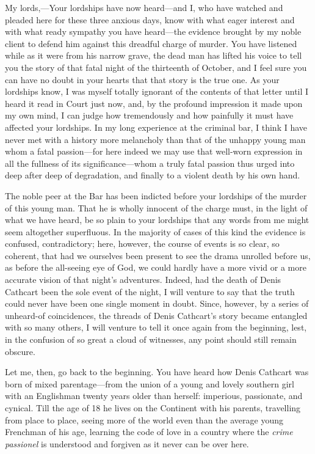 \begin{dialogue}
 My lords,—Your lordships have now heard—and I, who have watched and pleaded here for these three anxious days, know with what eager interest and with what ready sympathy you have heard—the evidence brought by my noble client to defend him against this dreadful charge of murder. You have listened while as it were from his narrow grave, the dead man has lifted his voice to tell you the story of that fatal night of the thirteenth of October, and I feel sure you can have no doubt in your hearts that that story is the true one. As your lordships know, I was myself totally ignorant of the contents of that letter until I heard it read in Court just now, and, by the profound impression it made upon my own mind, I can judge how tremendously and how painfully it must have affected your lordships. In my long experience at the criminal bar, I think I have never met with a history more melancholy than that of the unhappy young man whom a fatal passion—for here indeed we may use that well-worn expression in all the fullness of its significance—whom a truly fatal passion thus urged into deep after deep of degradation, and finally to a violent death by his own hand.

\smallskip 

The noble peer at the Bar has been indicted before your lordships of the murder of this young man. That he is wholly innocent of the charge must, in the light of what we have heard, be so plain to your lordships that any words from me might seem altogether superfluous. In the majority of cases of this kind the evidence is confused, contradictory; here, however, the course of events is so clear, so coherent, that had we ourselves been present to see the drama unrolled before us, as before the all-seeing eye of God, we could hardly have a more vivid or a more accurate vision of that night's adventures. Indeed, had the death of Denis Cathcart been the sole event of the night, I will venture to say that the truth could never have been one single moment in doubt. Since, however, by a series of unheard-of coincidences, the threads of Denis Cathcart's story became entangled with so many others, I will venture to tell it once again from the beginning, lest, in the confusion of so great a cloud of witnesses, any point should still remain obscure.

\smallskip 

Let me, then, go back to the beginning. You have heard how Denis Cathcart was born of mixed parentage—from the union of a young and lovely southern girl with an Englishman twenty years older than herself: imperious, passionate, and cynical. Till the age of 18 he lives on the Continent with his parents, travelling from place to place, seeing more of the world even than the average young Frenchman of his age, learning the code of love in a country where the \textit{crime passionel} is understood and forgiven as it never can be over here.


\end{dialogue}
